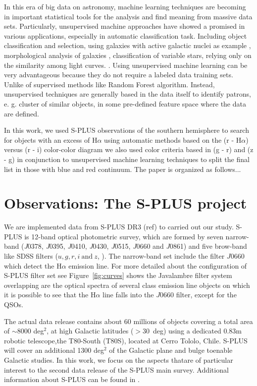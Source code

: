 \documentclass[fleqn,usenatbib]{mnras}
\begin{document}
In this era of big data on astronomy, machine learning techniques are becoming
in important statistical tools for the analysis and find meaning from massive
data sets. Particularly, unsupervised machine approaches have showed a promised
in various applications, especially in automatic classification task. Including
object classification and selection, using galaxies with active galactic nuclei
as example \citep{Geach:2012}, morphological analysis of galaxies \citep{Martin:2020},
classification of variable stars, relying only on the similarity among light
curves. \citep{Valenzuela:2018}. Using unsupervised machine
learning can be very advantageous because they do not require a labeled data
training sets. Unlike of supervised methods like Random Forest algorithm.
Instead, unsupervised techniques are generally based in the data itself to
identify patrons, e. g. cluster of similar objects, in some pre-defined
feature space where the data are defined.

In this work, we used S-PLUS observations of the southern hemisphere to search
for objects with an excess of H{$\alpha$} using automatic methods based on the
(r - H$\alpha$) versus (r - i) color-color diagram we also used color criteria
based in (g - r) and (z - g) in conjunction to unsupervised machine learning
techniques to split the final list in those with blue and red continuum. The
paper is organized as follows...

\section{Observations: The S-PLUS project}
\label{sec:obser}

We are implemented data from S-PLUS DR3 (ref) to carried out our
study. S-PLUS is 12-band optical photometric survey, which are formed by
seven narrow-band (\textit{J}0378, \textit{J}0395, \textit{J}0410, \textit{J}0430,
\textit{J}0515, \textit{J}0660 and \textit{J}0861) and five brow-band like
SDSS filters (\(u, g, r, i~\mathrm{and}~z\), \citealp{Fukugita:1996}).
The narrow-band set include the filter $J$0660 which detect
the H{$\alpha$} emission line. For more detailed about the configuration of
S-PLUS filter set see Figure~\ref{fig:curves} shows the Javalambre filter
system \citep{Martin-Franch:2012} overlapping are the optical spectra of
several class emission line objects on which it is possible to see that the
H{$\alpha$} line falls into the $J$0660 filter, except for the QSOs.   

The actual data release contains about 60 millions of objects covering a total
area of $\sim$8000 deg$^2$, at high Galactic latitudes ($ > 30$~deg) using a
dedicated 0.83m robotic telescope,the T80-South (T80S), located at Cerro Tololo,
Chile. S-PLUS will cover an additional 1300 deg$^2$ of the Galactic plane and bulge
toenable Galactic studies. In this work, we focus on the aspects thatare of
particular interest to the second data release of the S-PLUS main survey.
Additional information about S-PLUS can be found in \citet{Mendes:2019}. 
\end{document}
